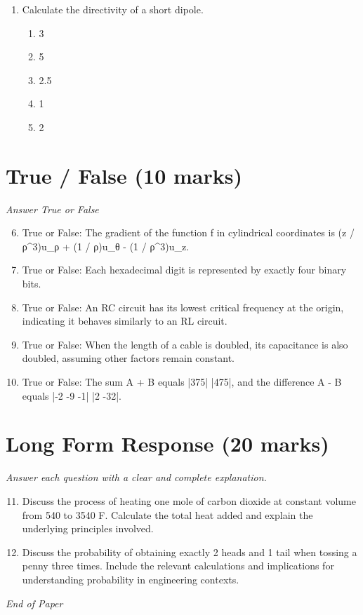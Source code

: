 \documentclass[12pt]{article}
\begin{document}
\begin{enumerate}[label=\arabic*.]
\begin{enumerate}[label=(\alph*)]
    \item 12
    \item 4
    \item 10
    \item 18
\end{enumerate}
\item Calculate the directivity of a short dipole.
\begin{enumerate}[label=(\alph*)]
    \item 3
    \item 5
    \item 2.5
    \item 1
    \item 2
\end{enumerate}
\end{enumerate}

\section*{True / False (10 marks)}
\textit{Answer True or False}
\begin{enumerate}[label=\arabic*.]
\setcounter{enumi}{5}
\item True or False: The gradient of the function f in cylindrical coordinates is (z / ρ^3)u\_ρ + (1 / ρ)u\_θ - (1 / ρ^3)u\_z.
\item True or False: Each hexadecimal digit is represented by exactly four binary bits.
\item True or False: An RC circuit has its lowest critical frequency at the origin, indicating it behaves similarly to an RL circuit.
\item True or False: When the length of a cable is doubled, its capacitance is also doubled, assuming other factors remain constant.
\item True or False: The sum A + B equals |375| |475|, and the difference A - B equals |-2 -9 -1| |2 -32|.
\end{enumerate}

\section*{Long Form Response (20 marks)}
\textit{Answer each question with a clear and complete explanation.}
\begin{enumerate}[label=\arabic*.]
\setcounter{enumi}{10}
\item Discuss the process of heating one mole of carbon dioxide at constant volume from 540 to 3540 F. Calculate the total heat added and explain the underlying principles involved.
\item Discuss the probability of obtaining exactly 2 heads and 1 tail when tossing a penny three times. Include the relevant calculations and implications for understanding probability in engineering contexts.
\end{enumerate}

\vfill
\noindent\textit{End of Paper}
\end{document}
